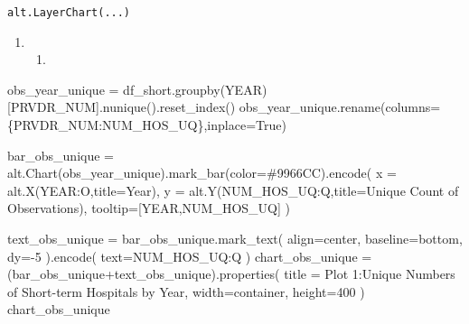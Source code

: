 \documentclass[
  letterpaper,
  DIV=11,
  numbers=noendperiod]{scrartcl}
\newenvironment{Shaded}{\begin{snugshade}}{\end{snugshade}}
\newcommand{\DecValTok}[1]{\textcolor[rgb]{0.68,0.00,0.00}{#1}}
\newcommand{\NormalTok}[1]{\textcolor[rgb]{0.00,0.23,0.31}{#1}}
\newcommand{\OperatorTok}[1]{\textcolor[rgb]{0.37,0.37,0.37}{#1}}
\newcommand{\StringTok}[1]{\textcolor[rgb]{0.13,0.47,0.30}{#1}}
\newcommand{\VariableTok}[1]{\textcolor[rgb]{0.07,0.07,0.07}{#1}}
\providecommand{\tightlist}{%
  \setlength{\itemsep}{0pt}\setlength{\parskip}{0pt}}\usepackage{longtable,booktabs,array}
\begin{document}
\begin{verbatim}
alt.LayerChart(...)
\end{verbatim}

\begin{enumerate}
\def\labelenumi{\arabic{enumi}.}
\setcounter{enumi}{3}
\tightlist
\item
  \begin{enumerate}
  \def\labelenumii{\alph{enumii}.}
  \tightlist
  \item
  \end{enumerate}
\end{enumerate}

\begin{Shaded}
\begin{Highlighting}[]
\NormalTok{obs\_year\_unique }\OperatorTok{=}\NormalTok{ df\_short.groupby(}\StringTok{\textquotesingle{}YEAR\textquotesingle{}}\NormalTok{)[}\StringTok{\textquotesingle{}PRVDR\_NUM\textquotesingle{}}\NormalTok{].nunique().reset\_index()}
\NormalTok{obs\_year\_unique.rename(columns}\OperatorTok{=}\NormalTok{\{}\StringTok{\textquotesingle{}PRVDR\_NUM\textquotesingle{}}\NormalTok{:}\StringTok{\textquotesingle{}NUM\_HOS\_UQ\textquotesingle{}}\NormalTok{\},inplace}\OperatorTok{=}\VariableTok{True}\NormalTok{)}

\NormalTok{bar\_obs\_unique }\OperatorTok{=}\NormalTok{ alt.Chart(obs\_year\_unique).mark\_bar(color}\OperatorTok{=}\StringTok{\textquotesingle{}\#9966CC\textquotesingle{}}\NormalTok{).encode(}
\NormalTok{  x }\OperatorTok{=}\NormalTok{ alt.X(}\StringTok{\textquotesingle{}YEAR:O\textquotesingle{}}\NormalTok{,title}\OperatorTok{=}\StringTok{\textquotesingle{}Year\textquotesingle{}}\NormalTok{),}
\NormalTok{  y }\OperatorTok{=}\NormalTok{ alt.Y(}\StringTok{\textquotesingle{}NUM\_HOS\_UQ:Q\textquotesingle{}}\NormalTok{,title}\OperatorTok{=}\StringTok{\textquotesingle{}Unique Count of Observations\textquotesingle{}}\NormalTok{),}
\NormalTok{  tooltip}\OperatorTok{=}\NormalTok{[}\StringTok{\textquotesingle{}YEAR\textquotesingle{}}\NormalTok{,}\StringTok{\textquotesingle{}NUM\_HOS\_UQ\textquotesingle{}}\NormalTok{]}
\NormalTok{)}

\NormalTok{text\_obs\_unique }\OperatorTok{=}\NormalTok{ bar\_obs\_unique.mark\_text(}
\NormalTok{    align}\OperatorTok{=}\StringTok{\textquotesingle{}center\textquotesingle{}}\NormalTok{,}
\NormalTok{    baseline}\OperatorTok{=}\StringTok{\textquotesingle{}bottom\textquotesingle{}}\NormalTok{,}
\NormalTok{    dy}\OperatorTok{={-}}\DecValTok{5}
\NormalTok{).encode(}
\NormalTok{    text}\OperatorTok{=}\StringTok{\textquotesingle{}NUM\_HOS\_UQ:Q\textquotesingle{}}
\NormalTok{)}
\NormalTok{chart\_obs\_unique }\OperatorTok{=}\NormalTok{ (bar\_obs\_unique}\OperatorTok{+}\NormalTok{text\_obs\_unique).properties(}
\NormalTok{  title }\OperatorTok{=} \StringTok{\textquotesingle{}Plot 1:Unique Numbers of Short{-}term Hospitals by Year\textquotesingle{}}\NormalTok{,}
\NormalTok{  width}\OperatorTok{=}\StringTok{\textquotesingle{}container\textquotesingle{}}\NormalTok{,}
\NormalTok{  height}\OperatorTok{=}\DecValTok{400}
\NormalTok{)}
\NormalTok{chart\_obs\_unique}
\end{Highlighting}
\end{Shaded}
\end{document}
